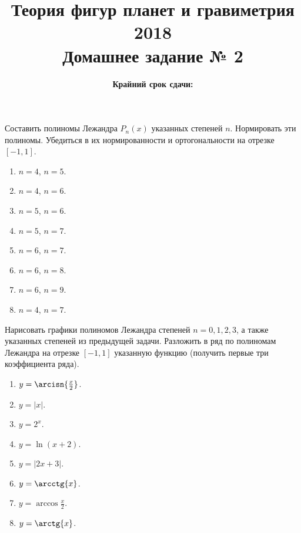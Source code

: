 \documentclass[11pt, a4paper,addpoints]{exam}
\title{{\Large Теория фигур планет и гравиметрия 2018}\\ 
    {\bf\Large Домашнее задание № 2}}
\author{}
\date{\normalsize\bf Крайний срок сдачи: \DTMusedate{deadline}}
\theoremstyle{remark}
\begin{document}
\maketitle
\thispagestyle{empty}
\begin{questions}
    \question[2] Составить полиномы Лежандра $P_n \left( x \right)$ указанных степеней $n$.
    Нормировать эти полиномы. Убедиться в их нормированности и ортогональности на отрезке $\left[
    -1, 1 \right]$.
    \begin{enumerate}
        \item $n = 4$, $n = 5$.
        \item $n = 4$, $n = 6$.
        \item $n = 5$, $n = 6$.
        \item $n = 5$, $n = 7$.
        \item $n = 6$, $n = 7$.
        \item $n = 6$, $n = 8$.
        \item $n = 6$, $n = 9$.
        \item $n = 4$, $n = 7$.
    \end{enumerate}
    \question[1] Нарисовать графики полиномов Лежандра степеней $n = 0, 1, 2, 3$, а также указанных
    степеней из предыдущей задачи.
    \question[2] Разложить в ряд по полиномам Лежандра на отрезке $\left[ -1, 1 \right]$ указанную
    функцию (получить первые три коэффициента ряда).
    \begin{enumerate}
        \item $y = \arcisn{\frac{x}{2}}$.
        \item $y = |x|$.
        \item $y = 2^x$.
        \item $y = \ln{\left( x + 2 \right)}$.
        \item $y = |2x + 3|$.
        \item $y = \arcctg{x}$.
        \item $y = \arccos{\frac{x}{2}}$.
        \item $y = \arctg{x}$.
    \end{enumerate}
    \end{questions}
\end{document}

